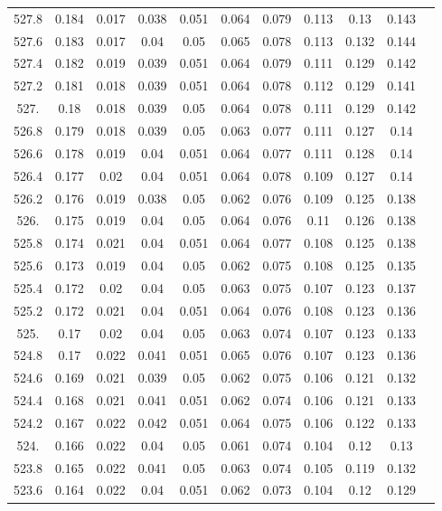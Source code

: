 \documentclass[12pt]{ctexart}
\numberwithin{equation}{section}
\begin{document}
\begin{longtable}{ccccccccccc}
527.8	&	0.184	&	0.017	&	0.038	&	0.051	&	0.064	&	0.079	&	0.113	&	0.13	&	0.143	\\
527.6	&	0.183	&	0.017	&	0.04	&	0.05	&	0.065	&	0.078	&	0.113	&	0.132	&	0.144	\\
527.4	&	0.182	&	0.019	&	0.039	&	0.051	&	0.064	&	0.079	&	0.111	&	0.129	&	0.142	\\
527.2	&	0.181	&	0.018	&	0.039	&	0.051	&	0.064	&	0.078	&	0.112	&	0.129	&	0.141	\\
527.	&	0.18	&	0.018	&	0.039	&	0.05	&	0.064	&	0.078	&	0.111	&	0.129	&	0.142	\\
526.8	&	0.179	&	0.018	&	0.039	&	0.05	&	0.063	&	0.077	&	0.111	&	0.127	&	0.14	\\
526.6	&	0.178	&	0.019	&	0.04	&	0.051	&	0.064	&	0.077	&	0.111	&	0.128	&	0.14	\\
526.4	&	0.177	&	0.02	&	0.04	&	0.051	&	0.064	&	0.078	&	0.109	&	0.127	&	0.14	\\
526.2	&	0.176	&	0.019	&	0.038	&	0.05	&	0.062	&	0.076	&	0.109	&	0.125	&	0.138	\\
526.	&	0.175	&	0.019	&	0.04	&	0.05	&	0.064	&	0.076	&	0.11	&	0.126	&	0.138	\\
525.8	&	0.174	&	0.021	&	0.04	&	0.051	&	0.064	&	0.077	&	0.108	&	0.125	&	0.138	\\
525.6	&	0.173	&	0.019	&	0.04	&	0.05	&	0.062	&	0.075	&	0.108	&	0.125	&	0.135	\\
525.4	&	0.172	&	0.02	&	0.04	&	0.05	&	0.063	&	0.075	&	0.107	&	0.123	&	0.137	\\
525.2	&	0.172	&	0.021	&	0.04	&	0.051	&	0.064	&	0.076	&	0.108	&	0.123	&	0.136	\\
525.	&	0.17	&	0.02	&	0.04	&	0.05	&	0.063	&	0.074	&	0.107	&	0.123	&	0.133	\\
524.8	&	0.17	&	0.022	&	0.041	&	0.051	&	0.065	&	0.076	&	0.107	&	0.123	&	0.136	\\
524.6	&	0.169	&	0.021	&	0.039	&	0.05	&	0.062	&	0.075	&	0.106	&	0.121	&	0.132	\\
524.4	&	0.168	&	0.021	&	0.041	&	0.051	&	0.062	&	0.074	&	0.106	&	0.121	&	0.133	\\
524.2	&	0.167	&	0.022	&	0.042	&	0.051	&	0.064	&	0.075	&	0.106	&	0.122	&	0.133	\\
524.	&	0.166	&	0.022	&	0.04	&	0.05	&	0.061	&	0.074	&	0.104	&	0.12	&	0.13	\\
523.8	&	0.165	&	0.022	&	0.041	&	0.05	&	0.063	&	0.074	&	0.105	&	0.119	&	0.132	\\
523.6	&	0.164	&	0.022	&	0.04	&	0.051	&	0.062	&	0.073	&	0.104	&	0.12	&	0.129	\\

\end{longtable}
\end{document}
